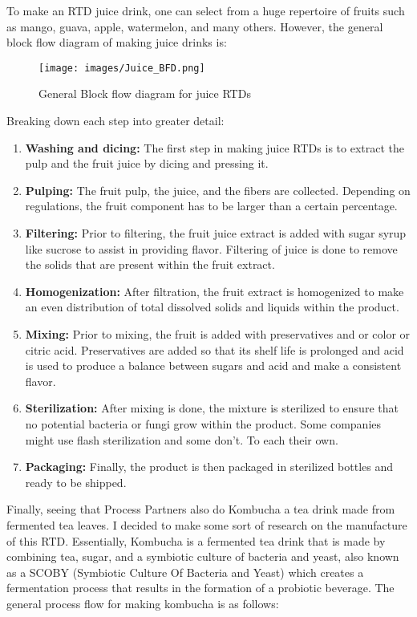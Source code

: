 \vspace{0.3cm}
To make an RTD juice drink,  one can select from a huge repertoire of fruits such as mango, guava, apple, watermelon, and many others. However, the general block flow diagram of making juice drinks is: 
\begin{figure}[H]
    \centering
    \texttt{[image: images/Juice\_BFD.png]}
    \caption{General Block flow diagram for juice RTDs}
    \label{fig:juice}
\end{figure}
Breaking down each step into greater detail: \begin{enumerate}
  \item \textbf{Washing and dicing: } The first step in making juice RTDs is to extract the pulp and the fruit juice by dicing and pressing it.
  \item \textbf{Pulping: } The fruit pulp, the juice, and the fibers are collected. Depending on regulations, the fruit component has to be larger than a certain percentage. 
  \item \textbf{Filtering: }Prior to filtering, the fruit juice extract is added with sugar syrup like sucrose to assist in providing flavor. Filtering of juice is done to remove the solids that are present within the fruit extract. 
  \item \textbf{Homogenization: } After filtration, the fruit extract is homogenized to make an even distribution of total dissolved solids and liquids within the product. 
  \item \textbf{Mixing: }Prior to mixing, the fruit is added with preservatives and or color or citric acid. Preservatives are added so that its shelf life is prolonged and acid is used to produce a balance between sugars and acid and make a consistent flavor.
  \item \textbf{Sterilization: }After mixing is done, the mixture is sterilized to ensure that no potential bacteria or fungi grow within the product. Some companies might use flash sterilization and some don't. To each their own.
  \item \textbf{Packaging: } Finally, the product is then packaged in sterilized bottles and ready to be shipped. 
\end{enumerate}
Finally, seeing that Process Partners also do Kombucha a tea drink made from fermented tea leaves. I decided to make some sort of research on the manufacture of this RTD. Essentially, Kombucha is a fermented tea drink that is made by combining tea, sugar, and a symbiotic culture of bacteria and yeast, also known as a SCOBY (Symbiotic Culture Of Bacteria and Yeast) which creates a fermentation process that results in the formation of a probiotic beverage. The general process flow for making kombucha is as follows:
